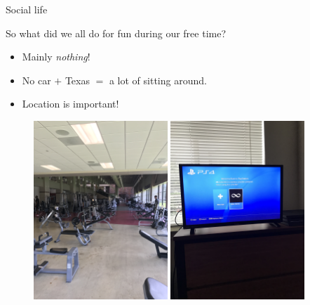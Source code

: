 \documentclass[8pt]{beamer}
\begin{document}
\begin{frame}{Social life}

So what did we all do for fun during our free time?
\begin{itemize}
    \item Mainly \textit{nothing}!
    \item No car $+$ Texas $=$ a lot of sitting around.
    \item Location is important!
\end{itemize} %

\begin{figure}
    \centering
    \includegraphics[width = 0.45\textwidth, angle = 270, origin = c]{gym.JPG} \hspace{0.5cm}
    \includegraphics[width = 0.45\textwidth, angle = 270, origin = c]{ps4.JPG}
\end{figure}
    
\end{frame}
\end{document}
